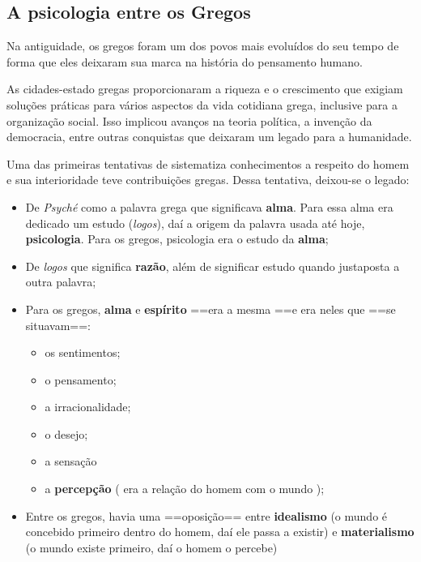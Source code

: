 \documentclass[
]{book}
\providecommand{\tightlist}{%
  \setlength{\itemsep}{0pt}\setlength{\parskip}{0pt}}
\theoremstyle{definition}
\theoremstyle{definition}
\theoremstyle{definition}
\theoremstyle{definition}
\theoremstyle{remark}
\begin{document}
\hypertarget{a-psicologia-entre-os-gregos}{%
\subsection*{A psicologia entre os Gregos}\label{a-psicologia-entre-os-gregos}}

Na antiguidade, os gregos foram um dos povos mais evoluídos do seu tempo de forma que eles deixaram sua marca na história do pensamento humano.

As cidades-estado gregas proporcionaram a riqueza e o crescimento que exigiam soluções práticas para vários aspectos da vida cotidiana grega, inclusive para a organização social. Isso implicou avanços na teoria política, a invenção da democracia, entre outras conquistas que deixaram um legado para a humanidade.

Uma das primeiras tentativas de sistematiza conhecimentos a respeito do homem e sua interioridade teve contribuições gregas. Dessa tentativa, deixou-se o legado:

\begin{itemize}
\tightlist
\item
  De \emph{Psyché} como a palavra grega que significava \textbf{alma}. Para essa alma era dedicado um estudo (\emph{logos}), daí a origem da palavra usada até hoje, \textbf{psicologia}. Para os gregos, psicologia era o estudo da \textbf{alma};
\item
  De \emph{logos} que significa \textbf{razão}, além de significar estudo quando justaposta a outra palavra;
\item
  Para os gregos, \textbf{alma} e \textbf{espírito} ==era a mesma ==e era neles que ==se situavam==:

  \begin{itemize}
  \tightlist
  \item
    os sentimentos;
  \item
    o pensamento;
  \item
    a irracionalidade;
  \item
    o desejo;
  \item
    a sensação
  \item
    a \textbf{percepção} ( era a relação do homem com o mundo );
  \end{itemize}
\item
  Entre os gregos, havia uma ==oposição== entre \textbf{idealismo} (o mundo é concebido primeiro dentro do homem, daí ele passa a existir) e \textbf{materialismo} (o mundo existe primeiro, daí o homem o percebe)
\end{itemize}
\end{document}

